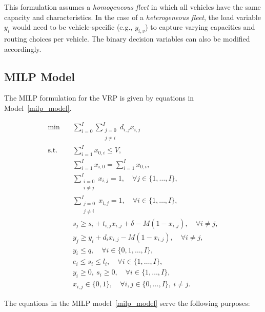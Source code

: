 \documentclass[11pt]{article}
\begin{document}
This formulation assumes a \emph{homogeneous fleet} in which all vehicles have the same capacity and characteristics. In the case of a \emph{heterogeneous fleet}, the load variable $y_i$ would need to be vehicle-specific (e.g., $y_{i,v}$) to capture varying capacities and routing choices per vehicle. The binary decision variables can also be modified accordingly.

\subsection{MILP Model}

The MILP formulation for the VRP is given by equations in Model~\eqref{milp_model}.

\begin{subequations}
\label{milp_model}
\begin{align}
    \min \quad & \sum_{i = 0}^I \sum_{\substack{j = 0 \\ j \neq i}}^I d_{i, j} x_{i, j} \label{obj} \\
    \text{s.t.} \quad
    & \sum_{i = 1}^I x_{0, i} \leq V, \label{c1} \\
    & \sum_{i = 1}^I x_{i, 0} = \sum_{i = 1}^I x_{0, i}, \label{c2} \\
    & \sum_{\substack{i = 0 \\ i \neq j}}^I x_{i, j} = 1, \quad \forall j \in \{1, \ldots, I\}, \label{c3} \\
    & \sum_{\substack{j = 0 \\ j \neq i}}^I x_{i, j} = 1, \quad \forall i \in \{1, \ldots, I\}, \label{c4} \\
    & s_j \geq s_i + t_{i, j} x_{i, j} + \delta - M (1 - x_{i, j}), \quad \forall i \neq j, \label{c5} \\
    & y_j \geq y_i + d_i x_{i, j} - M (1 - x_{i, j}), \quad \forall i \neq j, \label{c6} \\
    & y_i \leq q, \quad \forall i \in \{0, 1, \ldots, I\}, \label{c7} \\
    & e_i \leq s_i \leq l_i, \quad \forall i \in \{1, \ldots, I\}, \label{c8} \\
    & y_i \geq 0,\ s_i \geq 0, \quad \forall i \in \{1, \ldots, I\}, \label{c9} \\
    & x_{i, j} \in \{0, 1\}, \quad \forall i, j \in \{0, \ldots, I\},\ i \neq j. \label{c10}
\end{align}
\end{subequations}

The equations in the MILP model~\eqref{milp_model} serve the following purposes:
\end{document}
